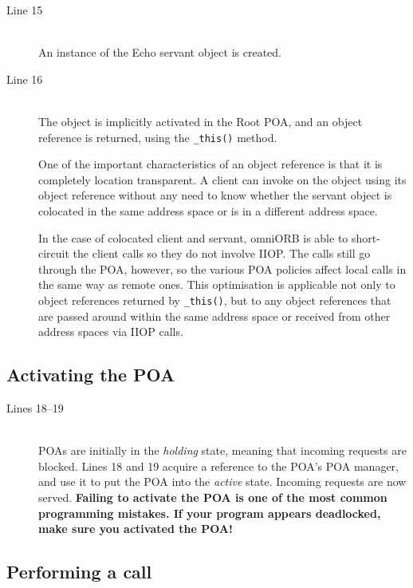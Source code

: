 \documentclass[11pt,twoside,a4paper]{book}
\newcommand{\op}[1]{\texttt{#1()}}
\newcommand{\term}[1]{\textit{#1}}
\begin{document}
\begin{description}

\item[Line 15]\mbox{}\\
%
An instance of the Echo servant object is created.

\item[Line 16]\mbox{}\\
%
The object is implicitly activated in the Root POA, and an object
reference is returned, using the \op{\_this} method.

One of the important characteristics of an object reference is that it
is completely location transparent. A client can invoke on the object
using its object reference without any need to know whether the
servant object is colocated in the same address space or is in a
different address space.

In the case of colocated client and servant, omniORB is able to
short-circuit the client calls so they do not involve IIOP. The calls
still go through the POA, however, so the various POA policies affect
local calls in the same way as remote ones. This optimisation is
applicable not only to object references returned by \op{\_this}, but
to any object references that are passed around within the same
address space or received from other address spaces via IIOP calls.

\end{description}


\subsection{Activating the POA}

\begin{description}

\item[Lines 18--19]\mbox{}\\
%
POAs are initially in the \term{holding} state, meaning that incoming
requests are blocked. Lines 18 and 19 acquire a reference to the POA's
POA manager, and use it to put the POA into the \term{active} state.
Incoming requests are now served. \textbf{Failing to activate the POA
is one of the most common programming mistakes. If your program
appears deadlocked, make sure you activated the POA!}

\end{description}


\subsection{Performing a call}
\end{document}
